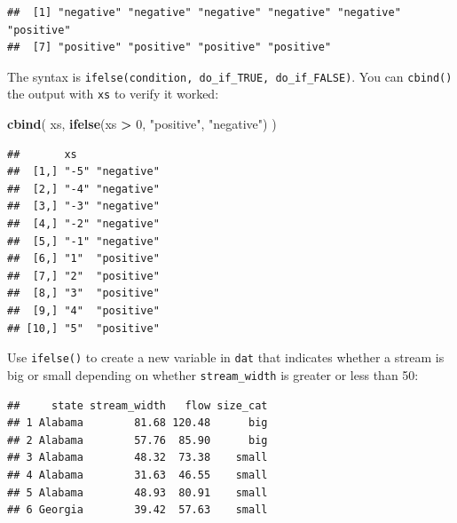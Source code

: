 \documentclass[]{book}
\newenvironment{Shaded}{\begin{snugshade}}{\end{snugshade}}
\newcommand{\DecValTok}[1]{\textcolor[rgb]{0.00,0.00,0.81}{#1}}
\newcommand{\KeywordTok}[1]{\textcolor[rgb]{0.13,0.29,0.53}{\textbf{#1}}}
\newcommand{\NormalTok}[1]{#1}
\newcommand{\OperatorTok}[1]{\textcolor[rgb]{0.81,0.36,0.00}{\textbf{#1}}}
\newcommand{\StringTok}[1]{\textcolor[rgb]{0.31,0.60,0.02}{#1}}
\begin{document}
\begin{verbatim}
##  [1] "negative" "negative" "negative" "negative" "negative" "positive"
##  [7] "positive" "positive" "positive" "positive"
\end{verbatim}

The syntax is \texttt{ifelse(condition,\ do\_if\_TRUE,\ do\_if\_FALSE)}. You can \texttt{cbind()} the output with \texttt{xs} to verify it worked:

\begin{Shaded}
\begin{Highlighting}[]
\KeywordTok{cbind}\NormalTok{(}
\NormalTok{  xs,}
  \KeywordTok{ifelse}\NormalTok{(xs }\OperatorTok{>}\StringTok{ }\DecValTok{0}\NormalTok{, }\StringTok{"positive"}\NormalTok{, }\StringTok{"negative"}\NormalTok{)}
\NormalTok{)}
\end{Highlighting}
\end{Shaded}

\begin{verbatim}
##       xs             
##  [1,] "-5" "negative"
##  [2,] "-4" "negative"
##  [3,] "-3" "negative"
##  [4,] "-2" "negative"
##  [5,] "-1" "negative"
##  [6,] "1"  "positive"
##  [7,] "2"  "positive"
##  [8,] "3"  "positive"
##  [9,] "4"  "positive"
## [10,] "5"  "positive"
\end{verbatim}

Use \texttt{ifelse()} to create a new variable in \texttt{dat} that indicates whether a stream is big or small depending on whether \texttt{stream\_width} is greater or less than 50:

\begin{Shaded}
\end{Shaded}

\begin{verbatim}
##     state stream_width   flow size_cat
## 1 Alabama        81.68 120.48      big
## 2 Alabama        57.76  85.90      big
## 3 Alabama        48.32  73.38    small
## 4 Alabama        31.63  46.55    small
## 5 Alabama        48.93  80.91    small
## 6 Georgia        39.42  57.63    small
\end{verbatim}
\end{document}
